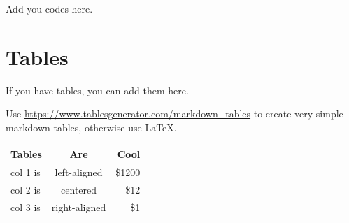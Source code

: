 \documentclass[mstat,12pt]{unswthesis}
\begin{document}
Add you codes here.

\section*{\texorpdfstring{\textbf{Tables}}{Tables}}\label{tables}

If you have tables, you can add them here.

Use \url{https://www.tablesgenerator.com/markdown_tables} to create very
simple markdown tables, otherwise use \LaTeX.

\begin{longtable}[]{@{}lcr@{}}
\toprule\noalign{}
Tables & Are & Cool \\
\midrule\noalign{}
\endhead
\bottomrule\noalign{}
\endlastfoot
col 1 is & left-aligned & \$1200 \\
col 2 is & centered & \$12 \\
col 3 is & right-aligned & \$1 \\
\end{longtable}
\end{document}
